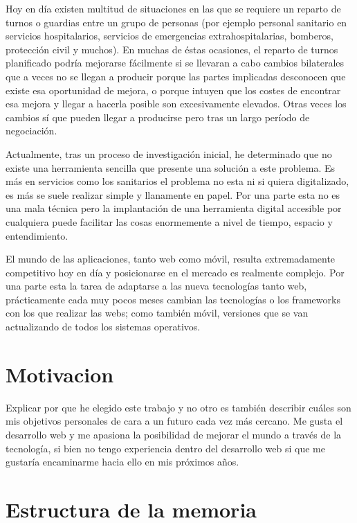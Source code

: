 

Hoy en día existen multitud de situaciones en las que se requiere un reparto de turnos o guardias entre un grupo de personas (por ejemplo personal sanitario en servicios hospitalarios, servicios de emergencias extrahospitalarias, bomberos, protección civil y muchos). En muchas de éstas ocasiones, el reparto de turnos planificado podría mejorarse fácilmente si se llevaran a cabo cambios bilaterales que a veces no se llegan a producir porque las partes implicadas desconocen que existe esa oportunidad de mejora, o porque intuyen que los costes de encontrar esa mejora y llegar a  hacerla posible son excesivamente elevados. Otras veces los cambios sí que pueden llegar a producirse pero tras un largo período de negociación.

Actualmente, tras un proceso de investigación inicial, he determinado que no existe una herramienta sencilla que presente una solución a este problema. Es más en servicios como los sanitarios el problema no esta ni si quiera digitalizado, es más se suele realizar simple y llanamente en papel. Por una parte esta no es una mala técnica pero la implantación de una herramienta digital accesible por cualquiera puede facilitar las cosas enormemente a nivel de tiempo, espacio y entendimiento. 

El mundo de las aplicaciones, tanto web como móvil, resulta extremadamente competitivo hoy en día y posicionarse en el mercado es realmente complejo. Por una parte esta la tarea de adaptarse a las nueva tecnologías tanto web, prácticamente cada muy pocos meses cambian las tecnologías o los frameworks con los que realizar las webs; como también móvil, versiones que se van actualizando de todos los sistemas operativos. 

\section{Motivacion}\label{Motivacion}

Explicar por que he elegido este trabajo y no otro es también describir cuáles son mis objetivos personales de cara a un futuro cada vez más cercano.  Me gusta el desarrollo web y me apasiona la posibilidad de mejorar el mundo a través de la tecnología, si bien no tengo experiencia dentro del desarrollo web si que me gustaría encaminarme hacia ello en mis próximos años. 

\section{Estructura de la memoria}\label{estructura-de-la-memoria}

